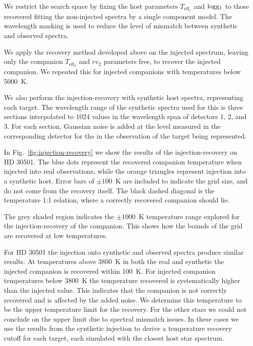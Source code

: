 \documentclass[fleqn,usenatbib]{mnras}
\begin{document}
We restrict the search space by fixing the host parameters \(T_{\textrm{eff}_1}\) and \(\rm logg_1\) to those recovered fitting the non-injected spectra by a single component model. The wavelength masking is used to reduce the level of mismatch between synthetic and observed spectra. 

We apply the recovery method developed above on the injected spectrum, leaving only the companion \(T_{\textrm{eff}_2}\) and \({rv}_2\) parameters free, to recover the injected companion. We repeated this for injected companions with temperatures below 5000~K. 

We also perform the injection-recovery with synthetic host spectra, representing each target. The wavelength range of the synthetic spectra used for this is three sections interpolated to 1024 values in the wavelength span of detectors 1, 2, and 3. For each section, Gaussian noise is added at the level measured in the corresponding detector for the in the observation of the target being represented.

In Fig.~\ref{fig:injection-recovery} we show the results of the injection-recovery on {HD 30501}. The blue dots represent the recovered companion temperature when injected into real observations, while the orange triangles represent injection into a synthetic host. Error bars of \(\pm100\)~K are included to indicate the grid size, and do not come from the recovery itself. The black dashed diagonal is the temperature 1:1 relation, where a correctly recovered companion should lie.

The grey shaded region indicates the \(\pm1000\)~K temperature range explored for the injection-recovery of the companion. This shows how the bounds of the grid are recovered at low temperatures.

For {HD 30501} the injection onto synthetic and observed spectra produce similar results. At temperatures above 3800~K in both the real and synthetic the injected companion is recovered within 100~K. For injected companion temperatures below 3800~K the temperature recovered is systematically higher than the injected value. This indicates that the companion is not correctly recovered and is affected by the added noise. We determine this temperature to be the upper temperature limit for the recovery. For the other stars we could not conclude on the upper limit due to spectral mismatch issues. In these cases we use the results from the synthetic injection to derive a temperature recovery cutoff for each target, each simulated with the closest host star spectrum.
\end{document}
